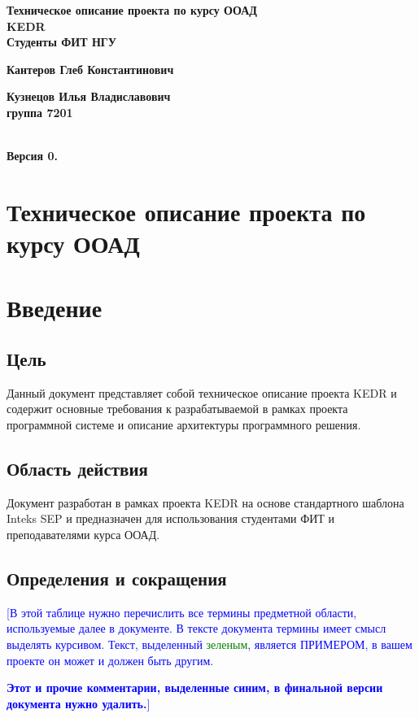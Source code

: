 \documentclass[pdftex,12pt,a4paper]{report}
\providecommand{\comment}[1]{\textcolor{blue}{#1}}
\providecommand{\replace}[1]{\textcolor{green}{#1}}
\begin{document}
\begin{titlepage}
\begin{flushright}
	{\huge
	\textbf{Техническое описание проекта по курсу ООАД}
\\[1cm]
	\textbf{KEDR}
\\[1cm]
	\textbf{Студенты ФИТ НГУ}

	\textbf{Кантеров Глеб Константинович}

	\textbf{Кузнецов Илья Владиславович}
\\[1cm]
	\textbf{группа 7201}
	}
\\[1cm]
	{\large \textbf{Версия 0.\svnInfoRevision}}
\end{flushright}
\end{titlepage}

\tableofcontents
\newpage

\section*{Техническое описание проекта по курсу ООАД}
\section{Введение}
\subsection{Цель}
Данный документ представляет собой техническое описание проекта KEDR и содержит основные требования к разрабатываемой в рамках проекта программной системе и описание архитектуры программного решения.

\subsection{Область действия}
Документ разработан в рамках проекта KEDR на основе стандартного шаблона Inteks SEP и предназначен для использования студентами ФИТ и преподавателями курса ООАД.

\subsection{Определения и сокращения}
\comment{[В этой таблице нужно перечислить все термины предметной области, используемые далее в документе. В тексте документа термины имеет смысл выделять курсивом. Текст, выделенный \replace{зеленым}, является ПРИМЕРОМ, в вашем проекте он может и должен быть другим.}

\comment{\textbf{Этот и прочие комментарии, выделенные синим, в финальной версии документа нужно удалить.}]}
\end{document}
